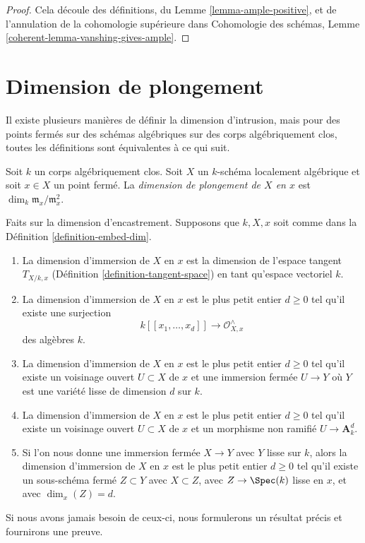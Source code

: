 \begin{proof}
Cela découle des définitions, du Lemme
\ref{lemma-ample-positive}, et de l'annulation de
la cohomologie supérieure dans Cohomologie des
schémas, Lemme \ref{coherent-lemma-vanshing-gives-ample}.
\end{proof}






\section{Dimension de plongement}
\label{section-embedding-dimension}

\noindent
Il existe plusieurs manières de définir la dimension d'intrusion, mais
pour des points fermés sur des schémas algébriques sur des corps
algébriquement clos, toutes les définitions sont équivalentes à ce qui suit.

\begin{definition}
\label{definition-embed-dim}
Soit $k$ un corps algébriquement clos. Soit $X$ un
$k$-schéma localement algébrique et soit $x \in X$ un
point fermé. La {\it dimension de plongement de $X$
en $x$ } est $\dim_k \mathfrak m_x/\mathfrak m_x^2$.
\end{definition}

\noindent
Faits sur la dimension d'encastrement. Supposons que $k, X,
x$ soit comme dans la Définition \ref{definition-embed-dim}.
\begin{enumerate}
\item La dimension d'immersion de $X$ en $x$
est la dimension de l'espace tangent $T_{X/k,
x}$ (Définition \ref{definition-tangent-space})
en tant qu'espace vectoriel $k$. \item La
dimension d'immersion de $X$ en $x$ est le plus
petit entier $d \geq 0$ tel qu'il existe une surjection
$$
k[[x_1, \ldots, x_d]] \longrightarrow \mathcal{O}_{X, x}^\wedge
$$
des algèbres $k$. \item La dimension d'immersion de $X$
en $x$ est le plus petit entier $d \geq 0$ tel qu'il
existe un voisinage ouvert $U \subset X$ de $x$ et une
immersion fermée $U \to Y$ où $Y$ est une variété lisse
de dimension $d$ sur $k$. \item La dimension d'immersion
de $X$ en $x$ est le plus petit entier $d \geq 0$ tel
qu'il existe un voisinage ouvert $U \subset X$ de $x$ et
un morphisme non ramifié $U \to \mathbf{A}^d_k$. \item Si
l'on nous donne une immersion fermée $X \to Y$ avec $Y$
lisse sur $k$, alors la dimension d'immersion de $X$ en
$x$ est le plus petit entier $d \geq 0$ tel qu'il existe
un sous-schéma fermé $Z \subset Y$ avec $X \subset Z$,
avec $Z \to \Spec(k)$ lisse en $x$, et avec $\dim_x(Z) = d$.
\end{enumerate}
Si nous avons jamais besoin de ceux-ci, nous
formulerons un résultat précis et fournirons une preuve.

